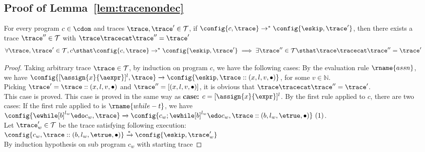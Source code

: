   \subsection{Proof of Lemma~\ref{lem:tracenondec}}
  \label{apdx:tracenondec}
  \begin{lemma}
    For every program $c \in \cdom$ and traces $\trace, \trace' \in \mathcal{T}$, if 
    $\config{c, \trace} \rightarrow^{*} \config{\eskip, \trace'}$,
    then there exists a trace $\trace'' \in \mathcal{T}$ with $\trace \tracecat \trace'' = \trace'$
    $$
    \forall \trace, \trace' \in \mathcal{T}, c \sthat 
    \config{c, \trace} \rightarrow^{*} \config{\eskip, \trace'} 
    \implies \exists \trace'' \in \mathcal{T} \sthat \trace \tracecat \trace'' = \trace'
    $$
    \end{lemma}
      \begin{proof}
      Taking arbitrary trace $\trace \in \mathcal{T}$, by induction on program $c$, we have the following cases:
      By the evaluation rule $\rname{assn}$, we have
      $
      {
      \config{[\assign{{x}}{\aexpr}]^{l},  \trace } 
      \xrightarrow{} 
      \config{\eskip, \trace :: ({x}, l, v, \bullet)}
      }$, for some $v \in \mathbb{N}$.
      \\
      Picking $\trace' = \trace ::({x}, l, v, \bullet)$ and $\trace'' =  [({x}, l, v, \bullet) ]$,
      it is obvious that $\trace \tracecat \trace'' = \trace'$.
      \\
      This case is proved.
      This case is proved in the same way as \textbf{case: $c = [\assign{x}{\expr}]^l$}.
      By the first rule applied to $c$, there are two cases:
      If the first rule applied to is $\rname{while-t}$, we have
      \\
      $\config{{\ewhile [b]^{l_w} \edo c_w, \trace}}
        \xrightarrow{} 
        \config{{
        c_w; \ewhile [b]^{l_w} \edo c_w,
        \trace :: (b, l_w, \etrue, \bullet)}}~ (1)
      $.
      \\
      Let $\trace_w' \in \mathcal{T}$ be the trace satisfying following execution:
      \\
      $
      \config{{
      c_w,
      \trace :: (b, l_w, \etrue, \bullet)}}
      \xrightarrow{*} 
      \config{{
      \eskip, \trace_w'}}
    $
    \\
    By induction hypothesis on sub program $c_w$ with starting trace 

\end{proof}
